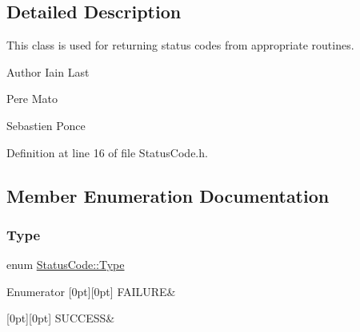 \subsection{Detailed Description}
This class is used for returning status codes from appropriate routines.

\begin{DoxyAuthor}{Author}
Iain Last 

Pere Mato 

Sebastien Ponce 
\end{DoxyAuthor}


Definition at line 16 of file Status\+Code.\+h.



\subsection{Member Enumeration Documentation}
\mbox{\label{classStatusCode_a6f565cbeadc76d14c72f047e5e85eb4b}} 
\subsubsection{\texorpdfstring{Type}{Type}}
{\footnotesize\ttfamily enum \hyperlink{classStatusCode_a6f565cbeadc76d14c72f047e5e85eb4b}{Status\+Code\+::\+Type}}

\begin{DoxyEnumFields}{Enumerator}
[0pt][0pt]{}\mbox{\label{classStatusCode_a6f565cbeadc76d14c72f047e5e85eb4ba3da73d4c469762eb9d3c960368252b26}} 
F\+A\+I\+L\+U\+RE&\\
\hline

[0pt][0pt]{}\mbox{\label{classStatusCode_a6f565cbeadc76d14c72f047e5e85eb4badd0da38d3ba0d922efd1f4619bc37ad8}} 
S\+U\+C\+C\+E\+SS&\\
\hline

\end{DoxyEnumFields}


